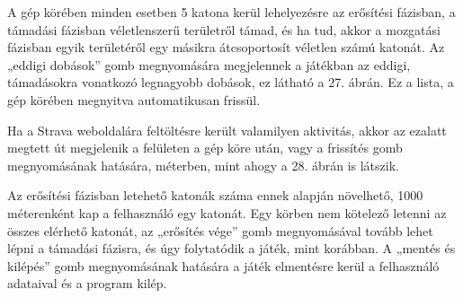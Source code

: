 A gép körében minden esetben 5 katona kerül lehelyezésre az erősítési fázisban, a támadási fázisban véletlenszerű területről támad, és ha tud, akkor a mozgatási fázisban egyik területéről egy másikra átcsoportosít véletlen számú katonát. Az „eddigi dobások” gomb megnyomására megjelennek a játékban az eddigi, támadásokra vonatkozó legnagyobb dobások, ez látható a 27. ábrán. Ez a lista, a gép körében megnyitva automatikusan frissül. 



Ha a Strava weboldalára feltöltésre került valamilyen aktivitás, akkor az ezalatt megtett út megjelenik a felületen a gép köre után, vagy a frissítés gomb megnyomásának hatására, méterben, mint ahogy a 28. ábrán is látszik. 



Az erősítési fázisban letehető katonák száma ennek alapján növelhető, 1000 méterenként kap a felhasználó egy katonát. Egy körben nem kötelező letenni az összes elérhető katonát, az „erősítés vége” gomb megnyomásával tovább lehet lépni a támadási fázisra, és úgy folytatódik a játék, mint korábban. A „mentés és kilépés” gomb megnyomásának hatására a játék elmentésre kerül a felhasználó adataival és a program kilép. 